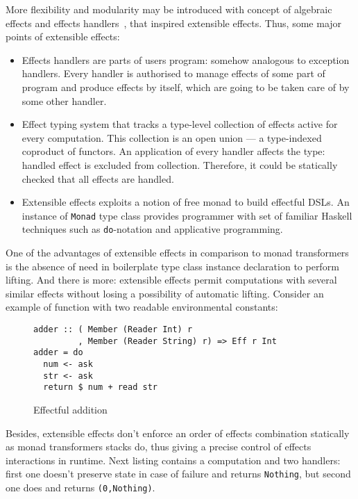     More flexibility and modularity may be introduced with concept of algebraic effects and
    effects handlers~\cite{DBLP:journals/jlp/BauerP15}, that inspired extensible effects.
    Thus, some major points of extensible effects:

    \begin{itemize}
    \item Effects handlers are parts of users program: somehow analogous to exception handlers.
    Every handler is authorised to manage effects of some part of program and produce effects by
    itself, which are going to be taken care of by some other handler.

    \item Effect typing system that tracks a type-level collection of effects active for every
    computation. This collection is an open union --- a type-indexed
    coproduct of functors. An application of every handler affects the type:
    handled effect is excluded from collection. Therefore, it could be statically
    checked that all effects are handled.

    \item Extensible effects exploits a notion of free monad to build effectful DSLs. An
    instance of \texttt{Monad} type class provides programmer with set of familiar
    Haskell techniques such as \texttt{do}-notation and applicative programming.
    \end{itemize}

    One of the advantages of extensible effects in comparison to monad transformers is the
    absence of need in boilerplate type class instance declaration to perform lifting. And
    there is more: extensible effects permit computations with several similar effects without
    losing a possibility of automatic lifting. Consider an example of function with two readable
    environmental constants:

    \begin{figure}[h]
    \begin{lstlisting}
adder :: ( Member (Reader Int) r
         , Member (Reader String) r) => Eff r Int
adder = do
  num <- ask
  str <- ask
  return $ num + read str
    \end{lstlisting}
    \caption{Effectful addition}
    \label{listing:ExtEffAdder}
    \end{figure}

    Besides, extensible effects don't enforce an order of effects combination statically as monad
    transformers stacks do, thus giving a precise control of effects interactions in runtime.
    Next listing contains a computation and two handlers: first one doesn't preserve state in
    case of failure and returns \texttt{Nothing}, but second one does and returns
    \texttt{(0,Nothing)}.


